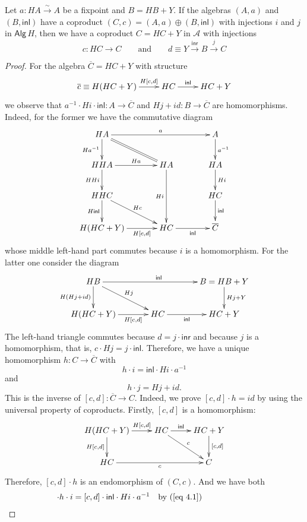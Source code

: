 \documentclass{LMCS}
\theoremstyle{plain}
\theoremstyle{definition}
\numberwithin{equation}{section}
\begin{document}
\begin{lem}\label{fixed point lemma}
Let $a:HA\stackrel{\sim}\to A$ be a fixpoint and $B=HB+Y$. If the algebras $(A,a)$ and $(B,\mathsf{inl})$ have a coproduct $(C,c)=(A,a)\oplus (B,\mathsf{inl})$ with injections $i$ and $j$ in $\mathsf{Alg}\,H$, then we have a coproduct $C=HC+Y$ in $\mathcal A$ with injections
$$c:HC\to C\qquad \text{and}\qquad  d\equiv Y\stackrel{\mathsf{inr}}\to B\stackrel{j}\to C$$
\end{lem}

\begin{proof}
For the algebra $\overline C=HC+Y$ with structure
$$\xymatrix{
\overline c\equiv H(HC+Y)\ar[r]^-{H[c,d]}&HC\ar[r]^-{\mathsf{inl}}&HC+Y
}$$
we observe that $a^{-1}\cdot Hi\cdot \mathsf{inl}:A\to \overline C$ and $Hj+id:B\to \overline C$  are homomorphisms.
Indeed, for the former we have the commutative diagram
$$\xymatrix@C+1pc{
HA\ar[rr]^-a\ar[d]_-{Ha^{-1}}\ar@{=}[dr]&&A\ar[d]^-{a^{-1}}\\
HHA\ar[r]^-{Ha}\ar[d]_-{HHi}&HA\ar[dd]_-{Hi}&HA\ar[d]^-{Hi}\\
HHC\ar[d]_-{H\mathsf{inl}}\ar[dr]^-{Hc}&&HC\ar[d]^-{\mathsf{inl}}\\
H(HC+Y)\ar[r]_-{H[c,d]}&HC\ar[r]_-{\mathsf{inl}}&\overline{C}
}$$
whose middle left-hand part commutes because $i$ is a homomorphism. For the latter one consider the diagram
$$\xymatrix@C+1pc{
HB\ar[rr]^{\mathsf{inl}}\ar[d]_-{H(Hj+id)}\ar[rd]^-{Hj}&&B=HB+Y\ar[d]^-{Hj+Y}\\
H(HC+Y)\ar[r]_-{H[c,d]}&HC\ar[r]_-{\mathsf{inl}}&HC+Y
}$$
The left-hand triangle commutes because $d=j\cdot\mathsf{inr}$ and because $j$ is a homomorphism, that is, $c\cdot Hj=j\cdot \mathsf{inl}$. Therefore, we have a unique homomorphism $h:C\to \overline C$ with
\begin{equation}\label{eq 4.1}
h\cdot i=\mathsf{inl}\cdot Hi\cdot a^{-1}
\end{equation}
and
\begin{equation}\label{eq 4.2}
h\cdot j= Hj+id.
\end{equation}
This is the inverse of $[c,d]:\overline C\to C$. Indeed, we prove $[c,d]\cdot h=id$ by using the universal property of coproducts. Firstly, $[c,d]$ is a homomorphism:
$$\xymatrix{
H(HC+Y)\ar[r]^-{H[c,d]}\ar[d]_-{H[c,d]}&HC\ar[r]^-{\mathsf{inl}}\ar[dr]^-c&HC+Y\ar[d]^-{[c,d]}\\
HC\ar[rr]_-c&&C
}$$
Therefore, $[c,d]\cdot h$ is an endomorphism of $(C,c)$. And we have both
\begin{align}
[c,d]\cdot h\cdot i&=[c,d]\cdot \mathsf{inl}\cdot Hi\cdot a^{-1}&\text{by (\ref{eq 4.1})\qquad\qquad\qquad}\notag\\

\end{align}
\end{proof}
\end{document}
